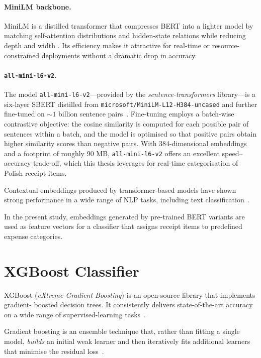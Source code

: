 \documentclass{SGGW-thesis-EN}
\begin{document}
\paragraph{MiniLM backbone.}
MiniLM is a distilled transformer that compresses BERT into a lighter model by matching
self-attention distributions and hidden-state relations while reducing depth and width
\cite{wang2020minilm}.
Its efficiency makes it attractive for real-time or resource-constrained deployments without
a dramatic drop in accuracy.

\paragraph{\texttt{all-mini-l6-v2}.}
The model \texttt{all-mini-l6-v2}—provided by the \emph{sentence-transformers} library—is a
six-layer SBERT distilled from \texttt{microsoft/MiniLM-L12-H384-uncased} and further
fine-tuned on \(\sim 1\) billion sentence pairs~\cite{reimers2021allminilm}.
Fine-tuning employs a batch-wise contrastive objective: the cosine similarity is computed for
each possible pair of sentences within a batch, and the model is optimised so that positive
pairs obtain higher similarity scores than negative pairs.
With 384-dimensional embeddings and a footprint of roughly 90 MB,
\texttt{all-mini-l6-v2} offers an excellent speed–accuracy trade-off, which this thesis
leverages for real-time categorisation of Polish receipt items.

Contextual embeddings produced by transformer-based models have shown strong performance in a
wide range of NLP tasks, including text classification~\cite{devlin2019bertpretrainingdeepbidirectional}.

In the present study, embeddings generated by pre-trained BERT variants are used as feature
vectors for a classifier that assigns receipt items to predefined expense categories.

\section{XGBoost Classifier}

XGBoost (\emph{eXtreme Gradient Boosting}) is an open-source library that implements gradient-
boosted decision trees.
It consistently delivers state-of-the-art accuracy on a wide range of supervised-learning tasks~\cite{Chen_2016}.

Gradient boosting is an ensemble technique that, rather than fitting a single model,
\emph{builds} an initial weak learner and then iteratively fits additional learners that
minimise the residual loss~\cite{natekin2013gradient}.
\end{document}
